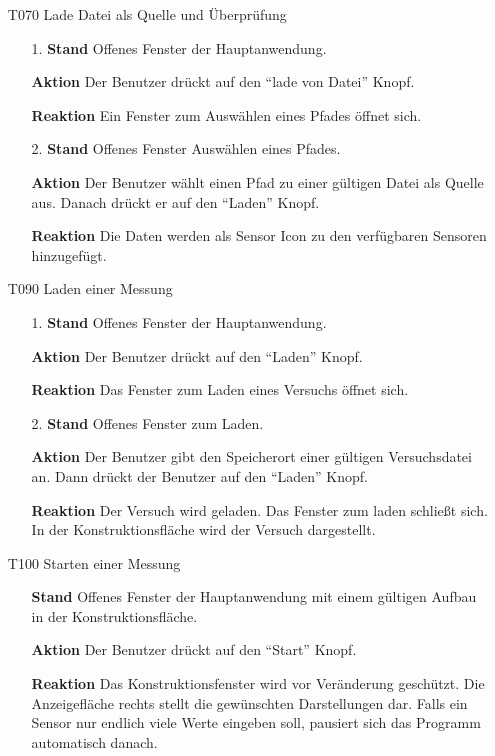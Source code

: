 \documentclass[parskip=full]{scrartcl}
\begin{document}
\begin{itemize}
\item[T070] Lade Datei als Quelle und Überprüfung
\begin{itemize}

\item[1.]\textbf {Stand} Offenes Fenster der Hauptanwendung.
\item[]\textbf{Aktion} Der Benutzer drückt auf den "`lade von Datei"' Knopf.
\item[]\textbf{Reaktion} Ein Fenster zum Auswählen eines Pfades öffnet sich.

\item[2.]\textbf {Stand} Offenes Fenster Auswählen eines Pfades.
\item[]\textbf{Aktion} Der Benutzer wählt einen Pfad zu einer gültigen Datei als Quelle aus. Danach drückt er auf den "`Laden"' Knopf.
\item[]\textbf{Reaktion} Die Daten werden als Sensor Icon zu den verfügbaren Sensoren hinzugefügt.

\end{itemize}

\item[T090] Laden einer Messung
\begin{itemize}

\item[1.]\textbf {Stand} Offenes Fenster der Hauptanwendung.
\item[]\textbf{Aktion} Der Benutzer drückt auf den "`Laden"' Knopf.
\item[]\textbf{Reaktion} Das Fenster zum Laden eines Versuchs öffnet sich.

\item[2.]\textbf {Stand} Offenes Fenster zum Laden.
\item[]\textbf{Aktion} Der Benutzer gibt den Speicherort einer gültigen Versuchsdatei an. Dann drückt der Benutzer auf den "`Laden"' Knopf.
\item[]\textbf{Reaktion} Der Versuch wird geladen. Das Fenster zum laden schließt sich. In der Konstruktionsfläche wird der Versuch dargestellt.

\end{itemize}

\item[T100] Starten einer Messung
\begin{itemize}
\item[]\textbf {Stand} Offenes Fenster der Hauptanwendung mit einem gültigen Aufbau in der Konstruktionsfläche.
\item[]\textbf{Aktion} Der Benutzer drückt auf den "`Start"' Knopf.
\item[]\textbf{Reaktion} Das Konstruktionsfenster wird vor Veränderung geschützt. Die Anzeigefläche rechts stellt die gewünschten Darstellungen dar. Falls ein Sensor nur endlich viele Werte eingeben soll, pausiert sich das Programm automatisch danach.
\end{itemize}


\end{itemize}
\end{document}
